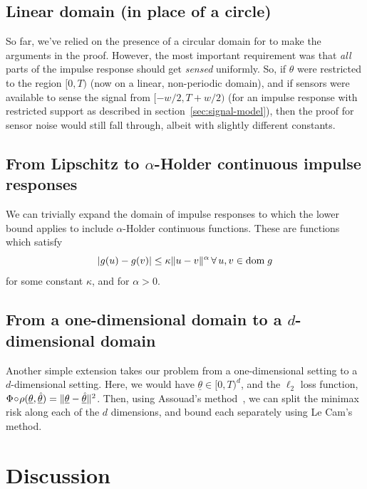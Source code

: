 \documentclass[conference]{IEEEtran}
\providecommand{\v}{}
\renewcommand{\v}[1]{\underline{#1}}
\providecommand{\vhat}{}
\renewcommand{\vhat}[1]{\underline{\hat{#1}}}
\DeclarePairedDelimiter\abs{\lvert}{\rvert}
\DeclarePairedDelimiter\norm{\lVert}{\rVert}
\newcommand{\Phiorho}{\Phi\!\circ\!\rho}
\begin{document}
\subsection{Linear domain (in place of a circle)}

So far, we've relied on the presence of a circular domain for to make the
arguments in the proof. However, the most important requirement was that
\emph{all} parts of the impulse response should get \emph{sensed} uniformly.
So, if $\theta$ were restricted to the region $[0, T)$ (now on a linear,
non-periodic domain), and if sensors were available to sense the signal from
$[-w/2, T{+}w/2)$ (for an impulse response with restricted support as described
in section~\ref{sec:signal-model}), then the proof for sensor noise would still
fall through, albeit with slightly different constants.

\subsection{From Lipschitz to $\alpha$-Holder continuous impulse responses}

We can trivially expand the domain of impulse responses to which the lower
bound applies to include $\alpha$-Holder continuous functions. These are
functions which satisfy
\begin{equation}
	\abs{g(u) - g(v)} \leq \kappa \norm{u - v}^\alpha \, \forall \, u, v \in \text{dom} \; g
\end{equation}
for some constant $\kappa$, and for $\alpha > 0$.

\subsection{From a one-dimensional domain to a $d$-dimensional domain}

Another simple extension takes our problem from a one-dimensional setting to a
$d$-dimensional setting. Here, we would have $\v\theta \in [0, T)^d$, and the
$\ell_2$ loss function, $\Phiorho(\v\theta, \vhat\theta) = \norm{\v\theta -
\vhat\theta}^2$. Then, using Assouad's method~\cite{Duchi2015Information}, we
can split the minimax risk along each of the $d$ dimensions, and bound each
separately using Le Cam's method.

\section{Discussion}
\label{sec:discussion}
\end{document}
